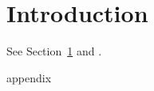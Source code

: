 \documentclass{article}
\begin{document}
\section{Introduction}
\label{sec:intro}
See Section~\ref{sec:intro} and \cite{knuthBook}.

{appendix}


\end{document}
